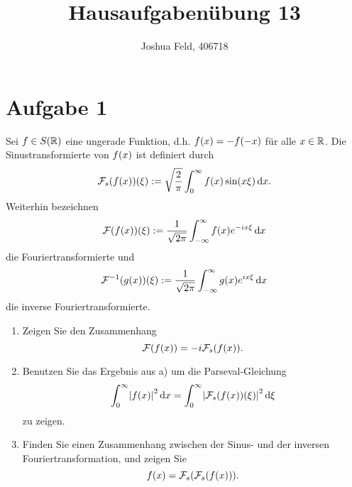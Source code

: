 \documentclass{exercise}
\institute{Applied and Computational Mathematics}
\title{Hausaufgabenübung 13}
\author{Joshua Feld, 406718}
\begin{document}
    \maketitle


    \section*{Aufgabe 1}
    
    \begin{problem}
        Sei \(f \in S\parentheses*{\R}\) eine ungerade Funktion, d.h. \(f\parentheses*{x} = -f\parentheses*{-x}\) für alle \(x \in \mathbb{R}\).
        Die Sinustransformierte von \(f\parentheses*{x}\) ist definiert durch
        \[
            \mathcal{F}_s\parentheses*{f\parentheses*{x}}\parentheses*{\xi} := \sqrt{\frac{2}{\pi}}\int_0^\infty f\parentheses*{x}\sin\parentheses*{x\xi}\d x.
        \]
        Weiterhin bezeichnen
        \[
            \mathcal{F}\parentheses*{f\parentheses*{x}}\parentheses*{\xi} := \frac{1}{\sqrt{2\pi}}\int_{-\infty}^\infty f\parentheses*{x}e^{-ix\xi}\d x
        \]
        die Fouriertransformierte und
        \[
            \mathcal{F}^{-1}\parentheses*{g\parentheses*{x}}\parentheses*{\xi} := \frac{1}{\sqrt{2\pi}}\int_{-\infty}^\infty g\parentheses*{x}e^{ix\xi}\d x
        \]
        die inverse Fouriertransformierte.
        \begin{enumerate}
            \item Zeigen Sie den Zusammenhang
            \[
                \mathcal{F}\parentheses*{f\parentheses*{x}} = -i\mathcal{F}_s\parentheses*{f\parentheses*{x}}.
            \]
            \item Benutzen Sie das Ergebnis aus a) um die Parseval-Gleichung
            \[
                \int_0^\infty \absolute*{f\parentheses*{x}}^2 \d x = \int_0^\infty \absolute*{\mathcal{F}_s\parentheses*{f\parentheses*{x}}\parentheses*{\xi}}^2 \d\xi
            \]
            zu zeigen.
            \item Finden Sie einen Zusammenhang zwischen der Sinus- und der inversen Fouriertransformation, und zeigen Sie
            \[
                f\parentheses*{x} = \mathcal{F}_s\parentheses*{\mathcal{F}_s\parentheses*{f\parentheses*{x}}}.
            \]
        \end{enumerate}
    \end{problem}
    
\end{document}
